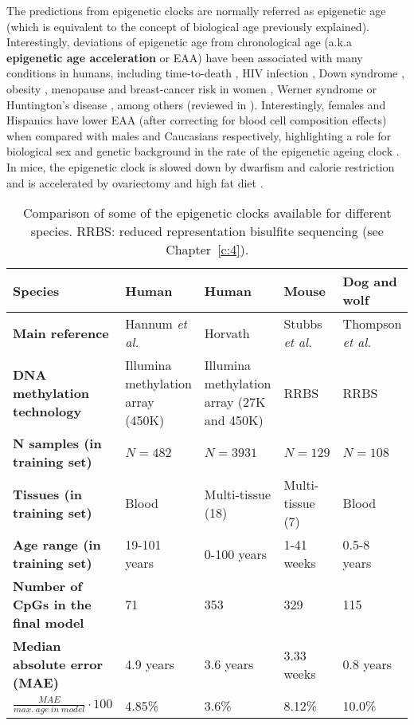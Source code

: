 The predictions from epigenetic clocks are normally referred as epigenetic age (which is equivalent to the concept of biological age previously explained). Interestingly, deviations of epigenetic age from chronological age (a.k.a \textbf{epigenetic age acceleration} or \acrshort{EAA}) have been associated with many conditions in humans, including time-to-death \cite{Chen2016,Marioni2015}, HIV infection \cite{Horvath2015b}, Down syndrome \cite{Horvath2015a}, obesity \cite{Horvath2014}, menopause \cite{Levine2016} and breast-cancer risk in women \cite{Kresovich2019}, Werner syndrome \cite{Maierhofer2017} or Huntington’s disease \cite{Horvath2016a}, among others (reviewed in \cite{Horvath2018}). Interestingly, females and Hispanics have lower \acrshort{EAA} (after correcting for blood cell composition effects) when compared with males and Caucasians respectively, highlighting a role for biological sex and genetic background in the rate of the epigenetic ageing clock \cite{Horvath2016}. In mice, the epigenetic clock is slowed down by dwarfism and calorie restriction \cite{Wang2017,Cole2017,Petkovich2017,Thompson2018,Meer2018} and is accelerated by ovariectomy and high fat diet \cite{Wang2017,Stubbs2017, Petkovich2017,Thompson2018}. 

\bigskip

\begin{table}
	\begin{tabular}{p{3.5cm} | p{2.5cm} p{2.5cm} p{2.5cm} p{2.5cm}}
		\toprule 
		\textbf{Species} & Human & Human & Mouse & Dog and wolf \\
		\midrule
		\textbf{Main reference} & Hannum \textit{et al.} \cite{Hannum2013} & Horvath \cite{Horvath2013} & Stubbs \textit{et al.} \cite{Stubbs2017} & Thompson \textit{et al.} \cite{Thompson2017} \\
		\midrule
		\textbf{DNA methylation technology} & Illumina methylation array (450K) & Illumina methylation array (27K and 450K) & RRBS & RRBS \\
		\midrule
		\textbf{N samples (in training set)} & $N=482$ & $N=3931$ & $N=129$ & $N=108$ \\
		\midrule
		\textbf{Tissues (in training set)} & Blood & Multi-tissue (18) & Multi-tissue (7) & Blood \\
		\midrule
		\textbf{Age range (in training set)} & 19-101 years & 0-100 years & 1-41 weeks & 0.5-8 years \\
		\midrule
		\textbf{Number of CpGs in the final model} & 71 & 353 & 329 & 115 \\
		\midrule
		\textbf{Median absolute error (\acrshort{MAE})} & 4.9 years & 3.6 years & 3.33 weeks & 0.8 years \\
		\midrule
		$\frac{MAE}{max.\ age\ in\ model} \cdot 100$ & 4.85\% & 3.6\% & 8.12\% & 10.0\% \\    
		\bottomrule 
	\end{tabular}
	\vspace*{3mm}
	\caption[Comparison of epigenetic clocks in different species]{Comparison of some of the epigenetic clocks available for different species. \acrshort{RRBS}: reduced representation bisulfite sequencing (see Chapter~\ref{c:4}).}
	\label{tab:clocks}
\end{table}  


